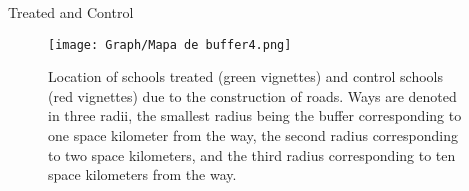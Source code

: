 \documentclass[9pt]{beamer}
\begin{document}
  
 

 



\begin{frame}{Treated and Control}
    \label{concession}
    \begin{figure}[H]
    \centering
        \renewcommand\thefigure{4.2}
    \texttt{[image: Graph/Mapa de buffer4.png]}  
    \caption { \small Location of schools treated (green vignettes) and control schools (red vignettes) due to the construction of roads.
    Ways are denoted in three radii, the smallest radius being the buffer corresponding to one space kilometer from the way, the second radius corresponding to two space kilometers, and the third radius corresponding to ten space kilometers from the way.
    \hyperlink{concession_anexo}{}   
    }
    \label{fig:Fig3}
\end{figure}


\end{frame}
\end{document}
